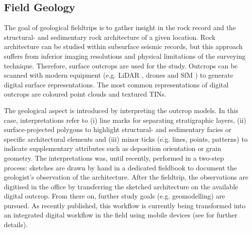 \documentclass[review]{elsarticle}
\begin{document}
\subsection{Field Geology}
\label{sec:applications:field_geology}

The goal of geological fieldtrips is to gather insight in the rock record and the structural- and sedimentary rock architecture of a given location. Rock architecture can be studied within subsurface seismic records, but this approach suffers from inferior imaging resolutions and physical limitations of the surveying technique. Therefore, surface outcrops are used for the study. Outcrops can be scanned with modern equipment (e.g. \gls{LiDAR} \cite{Buckley2008a,Buckley2010}, drones \cite{Dewez2015} and \gls{SfM} \cite{Chandler2016}) to generate digital surface representations. The most common representations of digital outcrops are coloured point clouds and textured \glspl{TIN}.

The geological aspect is introduced by interpreting the outcrop models. In this case, interpretations refer to (i) line marks for separating stratigraphic layers, (ii) surface-projected polygons to highlight structural- and sedimentary facies or specific architectural elements and (iii) minor ticks (e.g. lines, points, patterns) to indicate supplementary attributes such as deposition orientation or grain geometry. The interpretations was, until recently, performed in a two-step process: sketches are drawn by hand in a dedicated fieldbook to document the geologist's observation of the architecture. After the fieldtrip, the observations are digitised in the office by transferring the sketched architecture on the available digital outcrop. From there on, further study goals (e.g. geomodelling) are pursued. As recently published, this workflow is currently being transformed into an integrated digital workflow in the field using mobile devices (see \cite{Kehl2018_AGU} for further details).
\end{document}
